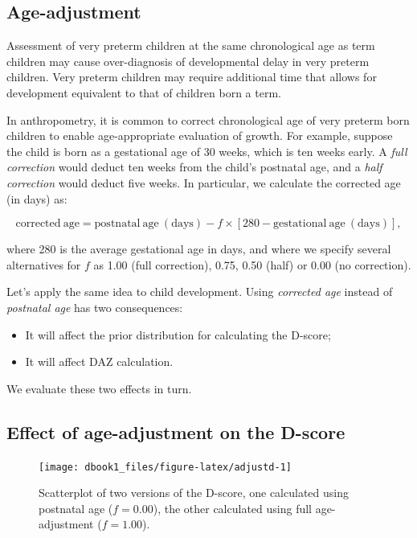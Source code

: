 \documentclass[
]{book}
\begin{document}
\hypertarget{age-adjustment}{%
\subsection{Age-adjustment}\label{age-adjustment}}

Assessment of very preterm children at the same chronological age as term children may cause over-diagnosis of developmental delay in very preterm children. Very preterm children may require additional time that allows for development equivalent to that of children born a term.

In anthropometry, it is common to correct chronological age of very preterm born children to enable age-appropriate evaluation of growth. For example, suppose the child is born as a gestational age of 30 weeks, which is ten weeks early. A \emph{full correction} would deduct ten weeks from the child's postnatal age, and a \emph{half correction} would deduct five weeks. In particular, we calculate the corrected age (in days) as:

\[
\mathrm{corrected\ age} = \mathrm{postnatal\ age}\mathrm{\ (days)} - f \times [280 - \mathrm{gestational\ age\ (days)}],
\]

where 280 is the average gestational age in days, and where we specify several alternatives for \(f\) as 1.00 (full correction), 0.75, 0.50 (half) or 0.00 (no correction).

Let's apply the same idea to child development. Using \emph{corrected age} instead of \emph{postnatal age} has two consequences:

\begin{itemize}
\item
  It will affect the prior distribution for calculating the D-score;
\item
  It will affect DAZ calculation.
\end{itemize}

We evaluate these two effects in turn.

\hypertarget{effect-of-age-adjustment-on-the-d-score}{%
\subsection{Effect of age-adjustment on the D-score}\label{effect-of-age-adjustment-on-the-d-score}}

\begin{figure}

{\centering \texttt{[image: dbook1\_files/figure-latex/adjustd-1]} 

}

\caption{Scatterplot of two versions of the D-score, one calculated using postnatal age (\(f = 0.00\)), the other calculated using full age-adjustment (\(f = 1.00\)).}\label{fig:adjustd}
\end{figure}
\end{document}

